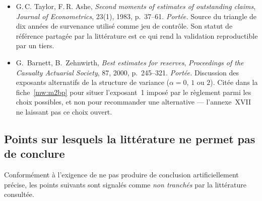 \documentclass[a4paper,11pt]{article}
\begin{document}
\begin{itemize}[itemsep=4pt]
  \item G.\,C. Taylor, F.\,R. Ashe, \emph{Second moments of estimates of
  outstanding claims}, \emph{Journal of Econometrics}, 23(1), 1983, p.~37--61.
  \emph{Portée.} Source du triangle de dix années de survenance utilisé comme jeu
  de contrôle. Son statut de référence partagée par la littérature est ce qui
  rend la validation reproductible par un tiers.

  \item G.~Barnett, B.~Zehnwirth, \emph{Best estimates for reserves},
  \emph{Proceedings of the Casualty Actuarial Society}, 87, 2000, p.~245--321.
  \emph{Portée.} Discussion des exposants alternatifs de la structure de
  variance ($\alpha = 0$, $1$ ou $2$). Citée dans la fiche~\ref{mw:m2bp} pour situer
  l'exposant~1 imposé par le règlement parmi les choix possibles, et non pour
  recommander une alternative --- l'annexe~XVII ne laissant pas ce choix ouvert.
\end{itemize}

\subsection*{Points sur lesquels la littérature ne permet pas de conclure}

Conformément à l'exigence de ne pas produire de conclusion artificiellement
précise, les points suivants sont signalés comme \emph{non tranchés} par la
littérature consultée.
\end{document}
